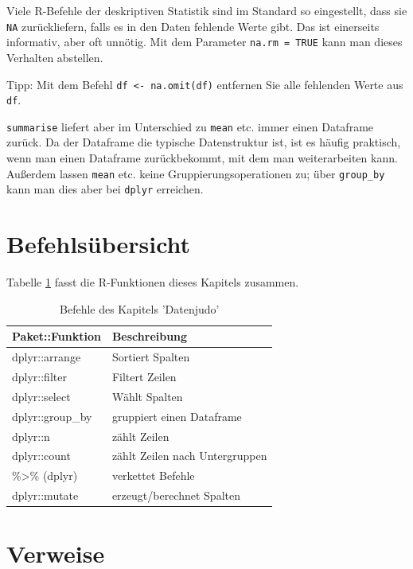 \documentclass[12pt,ngerman,]{book}
\theoremstyle{definition}
\theoremstyle{definition}
\theoremstyle{remark}
\let\BeginKnitrBlock\begin \let\EndKnitrBlock\end
\begin{document}
\BeginKnitrBlock{rmdcaution}
Viele R-Befehle der deskriptiven Statistik sind im Standard so
eingestellt, dass sie \texttt{NA} zurückliefern, falls es in den Daten
fehlende Werte gibt. Das ist einerseits informativ, aber oft unnötig.
Mit dem Parameter \texttt{na.rm\ =\ TRUE} kann man dieses Verhalten
abstellen.

Tipp: Mit dem Befehl \texttt{df\ \textless{}-\ na.omit(df)} entfernen
Sie alle fehlenden Werte aus \texttt{df}.
\EndKnitrBlock{rmdcaution}

\texttt{summarise} liefert aber im Unterschied zu \texttt{mean} etc.
immer einen Dataframe zurück. Da der Dataframe die typische
Datenstruktur ist, ist es häufig praktisch, wenn man einen Dataframe
zurückbekommt, mit dem man weiterarbeiten kann. Außerdem lassen
\texttt{mean} etc. keine Gruppierungsoperationen zu; über
\texttt{group\_by} kann man dies aber bei \texttt{dplyr} erreichen.

\section{Befehlsübersicht}\label{befehlsubersicht-2}

Tabelle \ref{tab:befehle-datenjudo} fasst die R-Funktionen dieses
Kapitels zusammen.

\begin{table}

\caption{\label{tab:befehle-datenjudo}Befehle des Kapitels 'Datenjudo'}
\centering
\begin{tabular}[t]{l|l}
\hline
Paket::Funktion & Beschreibung\\
\hline
dplyr::arrange & Sortiert Spalten\\
\hline
dplyr::filter & Filtert Zeilen\\
\hline
dplyr::select & Wählt Spalten\\
\hline
dplyr::group\_by & gruppiert einen Dataframe\\
\hline
dplyr::n & zählt Zeilen\\
\hline
dplyr::count & zählt Zeilen nach Untergruppen\\
\hline
\%>\% (dplyr) & verkettet Befehle\\
\hline
dplyr::mutate & erzeugt/berechnet Spalten\\
\hline
\end{tabular}
\end{table}

\section{Verweise}\label{verweise-2}
\end{document}
